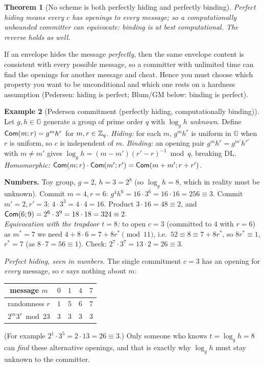 \documentclass[11pt,a4paper]{report}
\theoremstyle{plain}
\newtheorem{theorem}{Theorem}[chapter]
\theoremstyle{definition}
\newtheorem{example}[theorem]{Example}
\theoremstyle{remark}
\newcommand{\GG}{\mathbb{G}}
\begin{document}
\begin{theorem}[No scheme is both perfectly hiding and perfectly binding]
Perfect hiding means every $c$ has openings to every message; so a computationally unbounded committer can equivocate: binding is at best computational. The reverse holds as well.
\end{theorem}
\begin{plain}\PE
If an envelope hides the message \emph{perfectly}, then the same envelope content is consistent with every possible message, so a committer with unlimited time can find the openings for another message and cheat. Hence you must choose which property you want to be unconditional and which one rests on a hardness assumption (Pedersen: hiding is perfect; Blum/GM below: binding is perfect).
\end{plain}
\begin{example}[Pedersen commitment (perfectly hiding, computationally binding)]\label{ex:pedersen}
Let $g,h\in\GG$ generate a group of prime order $q$ with $\log_gh$ \emph{unknown}. Define $\mathsf{Com}(m;r)=g^mh^r$ for $m,r\in\mathbb{Z}_q$.
\emph{Hiding:} for each $m$, $g^mh^r$ is uniform in $\GG$ when $r$ is uniform, so $c$ is independent of $m$.
\emph{Binding:} an opening pair $g^mh^r=g^{m'}h^{r'}$ with $m\ne m'$ gives $\log_gh=(m-m')(r'-r)^{-1}\bmod q$, breaking DL.
\emph{Homomorphic:} $\mathsf{Com}(m;r)\cdot\mathsf{Com}(m';r')=\mathsf{Com}(m+m';r+r')$.

\textbf{Numbers.} Toy group, $g=2$, $h=3=2^8$ (so $\log_gh=8$, which in reality must be unknown). Commit $m=4,r=6$: $g^4h^6=16\cdot3^6=16\cdot16=256\equiv3$. Commit $m'=2,r'=3$: $4\cdot3^3=4\cdot4=16$. Product $3\cdot16=48\equiv2$, and $\mathsf{Com}(6;9)=2^6\cdot3^9=18\cdot18=324\equiv2$. \checkmark\\
\emph{Equivocation with the trapdoor $t=8$:} to open $c=3$ (committed to $4$ with $r=6$) as $m^*=7$ we need $4+8\cdot6=7+8r^*\pmod{11}$, i.e.\ $52\equiv8\equiv7+8r^*$, so $8r^*\equiv1$, $r^*=7$ (as $8\cdot7=56\equiv1$). Check: $2^7\cdot3^7=13\cdot2=26\equiv3$. \checkmark

\emph{Perfect hiding, seen in numbers.} The single commitment $c=3$ has an opening for \emph{every} message, so $c$ says nothing about $m$:
\begin{center}\small
\begin{tabular}{c|cccc}
message $m$ & $0$ & $1$ & $4$ & $7$\\\hline
randomness $r$ & $1$ & $5$ & $6$ & $7$\\
$2^m3^r\bmod23$ & $3$ & $3$ & $3$ & $3$
\end{tabular}
\end{center}
(For example $2^1\cdot3^5=2\cdot13=26\equiv3$.) Only someone who knows $t=\log_gh=8$ can \emph{find} these alternative openings, and that is exactly why $\log_gh$ must stay unknown to the committer.
\end{example}
\end{document}
